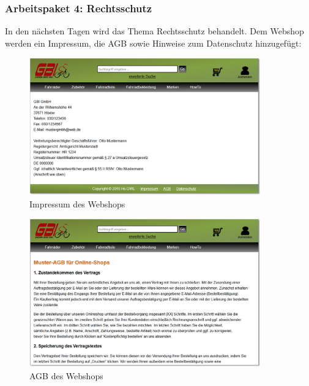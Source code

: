 \subsubsection{Arbeitspaket 4: Rechtsschutz}

In den nächsten Tagen wird das Thema Rechtsschutz behandelt. Dem Webshop werden ein Impressum, die AGB sowie Hinweise zum Datenschutz hinzugefügt:

\begin{figure}[H]
\begin{center}
\includegraphics[width=10cm]{Bilder/Abbildung6-ImpressumDesWebshops.png}
\end{center}
\caption{Impressum des Webshops}
\end{figure}

\begin{figure}
\begin{center}
\includegraphics[width=10cm]{Bilder/Abbildung7-AGBDesWebshops.png}
\end{center}
\caption{AGB des Webshops}
\end{figure}

